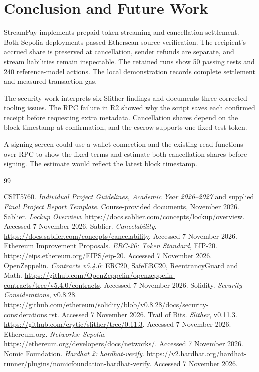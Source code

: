 \documentclass[12pt,a4paper]{report}
\makeatletter
\renewcommand\section{\@startsection{section}{1}{\z@}{-2.25ex\@plus-.4ex\@minus-.2ex}{1.1ex\@plus.2ex}{\normalfont\Large\bfseries}}
\makeatother
\begin{document}
\chapter{Conclusion and Future Work}
\section{Conclusion}
StreamPay implements prepaid token streaming and cancellation settlement. Both Sepolia deployments passed Etherscan source verification. The recipient's accrued share is preserved at cancellation, sender refunds are separate, and stream liabilities remain inspectable. The retained runs show 50 passing tests and 240 reference-model actions. The local demonstration records complete settlement and measured transaction gas.

The security work interprets six Slither findings and documents three corrected tooling issues. The RPC failure in R2 showed why the script saves each confirmed receipt before requesting extra metadata. Cancellation shares depend on the block timestamp at confirmation, and the escrow supports one fixed test token.

\section{Future Work}
A signing screen could use a wallet connection and the existing read functions over RPC to show the fixed terms and estimate both cancellation shares before signing. The estimate would reflect the latest block timestamp.

\begin{thebibliography}{99}
\raggedright
{}
 CSIT5760. \textit{Individual Project Guidelines, Academic Year 2026--2027} and supplied \textit{Final Project Report Template}. Course-provided documents, November 2026.
 Sablier. \textit{Lockup Overview}. \url{https://docs.sablier.com/concepts/lockup/overview}. Accessed 7 November 2026.
 Sablier. \textit{Cancelability}. \url{https://docs.sablier.com/concepts/cancelability}. Accessed 7 November 2026.
 Ethereum Improvement Proposals. \textit{ERC-20: Token Standard}, EIP-20. \url{https://eips.ethereum.org/EIPS/eip-20}. Accessed 7 November 2026.
 OpenZeppelin. \textit{Contracts v5.4.0}: ERC20, SafeERC20, ReentrancyGuard and Math. \url{https://github.com/OpenZeppelin/openzeppelin-contracts/tree/v5.4.0/contracts}. Accessed 7 November 2026.
 Solidity. \textit{Security Considerations}, v0.8.28. \url{https://github.com/ethereum/solidity/blob/v0.8.28/docs/security-considerations.rst}. Accessed 7 November 2026.
 Trail of Bits. \textit{Slither}, v0.11.3. \url{https://github.com/crytic/slither/tree/0.11.3}. Accessed 7 November 2026.
 Ethereum.org. \textit{Networks: Sepolia}. \url{https://ethereum.org/developers/docs/networks/}. Accessed 7 November 2026.
 Nomic Foundation. \textit{Hardhat 2: hardhat-verify}. \url{https://v2.hardhat.org/hardhat-runner/plugins/nomicfoundation-hardhat-verify}. Accessed 7 November 2026.
\end{thebibliography}
\end{document}

